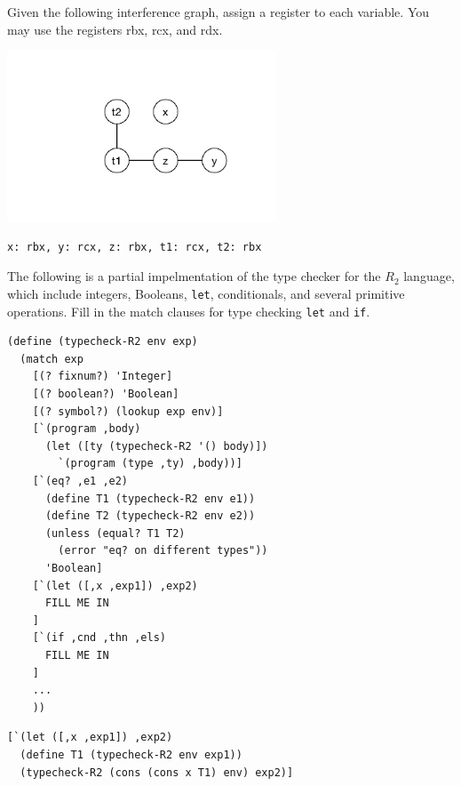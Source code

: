 \documentclass[12pt]{exam}
\begin{document}
\begin{questions}
\question[12] Given the following interference graph, assign a
register to each variable. You may use the registers rbx, rcx, and
rdx.
\begin{center}
\includegraphics[height=2in]{interfere2}
\end{center}

\begin{solution}[1in]
\begin{lstlisting}
x: rbx, y: rcx, z: rbx, t1: rcx, t2: rbx
\end{lstlisting}
\end{solution}


\question[12] The following is a partial impelmentation of the type
checker for the $R_2$ language, which include integers, Booleans,
\texttt{let}, conditionals, and several primitive operations. Fill in
the match clauses for type checking \texttt{let} and \texttt{if}.

\begin{lstlisting}
(define (typecheck-R2 env exp)
  (match exp
    [(? fixnum?) 'Integer]
    [(? boolean?) 'Boolean]
    [(? symbol?) (lookup exp env)]
    [`(program ,body)
      (let ([ty (typecheck-R2 '() body)])
        `(program (type ,ty) ,body))]
    [`(eq? ,e1 ,e2)
      (define T1 (typecheck-R2 env e1))
      (define T2 (typecheck-R2 env e2))
      (unless (equal? T1 T2)
        (error "eq? on different types"))
      'Boolean]
    [`(let ([,x ,exp1]) ,exp2)
      FILL ME IN
    ]
    [`(if ,cnd ,thn ,els)
      FILL ME IN
    ]
    ...
    ))
\end{lstlisting}

\begin{solution}
\begin{lstlisting}
[`(let ([,x ,exp1]) ,exp2)
  (define T1 (typecheck-R2 env exp1))
  (typecheck-R2 (cons (cons x T1) env) exp2)]


\end{lstlisting}
\end{solution}
\end{questions}
\end{document}
